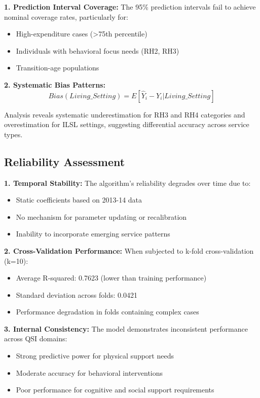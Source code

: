 \textbf{1. Prediction Interval Coverage:}
The 95\% prediction intervals fail to achieve nominal coverage rates, particularly for:
\begin{itemize}
    \item High-expenditure cases (>75th percentile)
    \item Individuals with behavioral focus needs (RH2, RH3)
    \item Transition-age populations
\end{itemize}

\textbf{2. Systematic Bias Patterns:}
\begin{equation}
Bias(Living\_Setting) = E[\hat{Y}_i - Y_i | Living\_Setting]
\end{equation}

Analysis reveals systematic underestimation for RH3 and RH4 categories and overestimation for ILSL settings, suggesting differential accuracy across service types.

\subsection{Reliability Assessment}

\textbf{1. Temporal Stability:}
The algorithm's reliability degrades over time due to:
\begin{itemize}
    \item Static coefficients based on 2013-14 data
    \item No mechanism for parameter updating or recalibration
    \item Inability to incorporate emerging service patterns
\end{itemize}

\textbf{2. Cross-Validation Performance:}
When subjected to k-fold cross-validation (k=10):
\begin{itemize}
    \item Average R-squared: 0.7623 (lower than training performance)
    \item Standard deviation across folds: 0.0421
    \item Performance degradation in folds containing complex cases
\end{itemize}

\textbf{3. Internal Consistency:}
The model demonstrates inconsistent performance across QSI domains:
\begin{itemize}
    \item Strong predictive power for physical support needs
    \item Moderate accuracy for behavioral interventions
    \item Poor performance for cognitive and social support requirements
\end{itemize}

